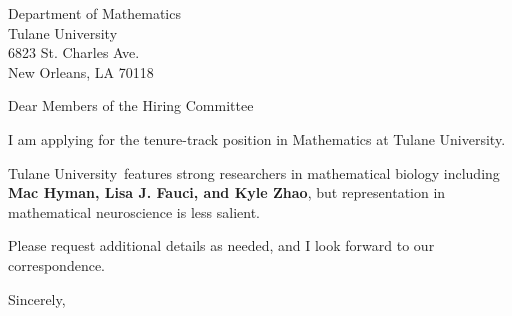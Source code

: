 




	
	
	\def\School{Tulane University}
	
	\begin{letter}
		{Department of Mathematics\\
			Tulane University\\
			6823 St. Charles Ave.\\
			New Orleans, LA 70118
		}
		
		\opening{Dear Members of the Hiring Committee}
		
		
		I am applying for the tenure-track position in Mathematics at \School. 
		
		\School~features strong researchers in mathematical biology including \textbf{Mac Hyman, Lisa J. Fauci, and Kyle Zhao}, but representation in mathematical neuroscience is less salient. 
		
		
		
		
		
		Please request additional details as needed, and I look forward to our correspondence.
		
		\closing{Sincerely,}
	\end{letter}
